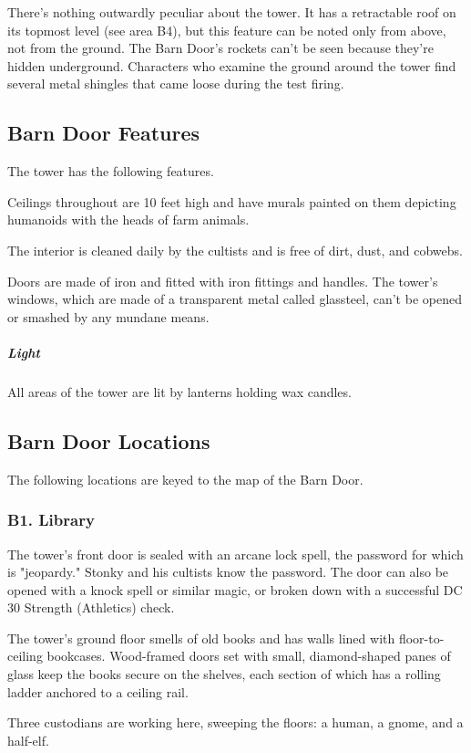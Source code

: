 \documentclass[10pt,a4paper,twoside,bg=print,twocolumn,openany,nodeprecatedcode]{dndbook}
\begin{document}
There's nothing outwardly peculiar about the tower. It has a retractable roof on its topmost level (see area B4), but this feature can be noted only from above, not from the ground. The Barn Door's rockets can't be seen because they're hidden underground. Characters who examine the ground around the tower find several metal shingles that came loose during the test firing.

\subsection{Barn Door Features}
The tower has the following features.


\begin{description}[nolistsep]
\item[Ceilings]
Ceilings throughout are 10 feet high and have murals painted on them depicting humanoids with the heads of farm animals.
\item[Cleanliness]
The interior is cleaned daily by the cultists and is free of dirt, dust, and cobwebs.
\item[Doors and Windows]
Doors are made of iron and fitted with iron fittings and handles. The tower's windows, which are made of a transparent metal called glassteel, can't be opened or smashed by any mundane means.
\end{description}

\subparagraph{Light}
All areas of the tower are lit by lanterns holding wax candles.

\subsection{Barn Door Locations}
The following locations are keyed to the map of the Barn Door.

\subsubsection{B1. Library}
The tower's front door is sealed with an arcane lock spell, the password for which is "jeopardy." Stonky and his cultists know the password. The door can also be opened with a knock spell or similar magic, or broken down with a successful DC 30 Strength (Athletics) check.

\begin{DndReadAloud}{}
The tower's ground floor smells of old books and has walls lined with floor-to-ceiling bookcases. Wood-framed doors set with small, diamond-shaped panes of glass keep the books secure on the shelves, each section of which has a rolling ladder anchored to a ceiling rail.

Three custodians are working here, sweeping the floors: a human, a gnome, and a half-elf.

\end{DndReadAloud}
\end{document}
